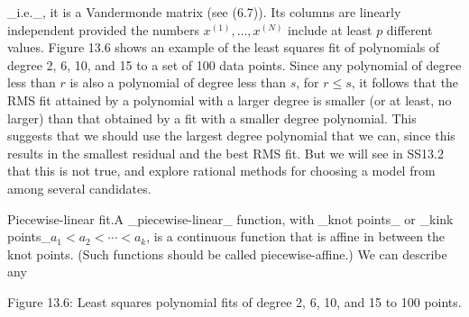 _i.e._, it is a Vandermonde matrix (see (6.7)). Its columns are linearly independent provided the numbers \(x^{(1)},\ldots,x^{(N)}\) include at least \(p\) different values. Figure 13.6 shows an example of the least squares fit of polynomials of degree 2, 6, 10, and 15 to a set of 100 data points. Since any polynomial of degree less than \(r\) is also a polynomial of degree less than \(s\), for \(r\leq s\), it follows that the RMS fit attained by a polynomial with a larger degree is smaller (or at least, no larger) than that obtained by a fit with a smaller degree polynomial. This suggests that we should use the largest degree polynomial that we can, since this results in the smallest residual and the best RMS fit. But we will see in SS13.2 that this is not true, and explore rational methods for choosing a model from among several candidates.

Piecewise-linear fit.A _piecewise-linear_ function, with _knot points_ or _kink points_\(a_{1}<a_{2}<\cdots<a_{k}\), is a continuous function that is affine in between the knot points. (Such functions should be called piecewise-affine.) We can describe any

Figure 13.6: Least squares polynomial fits of degree 2, 6, 10, and 15 to 100 points.

 